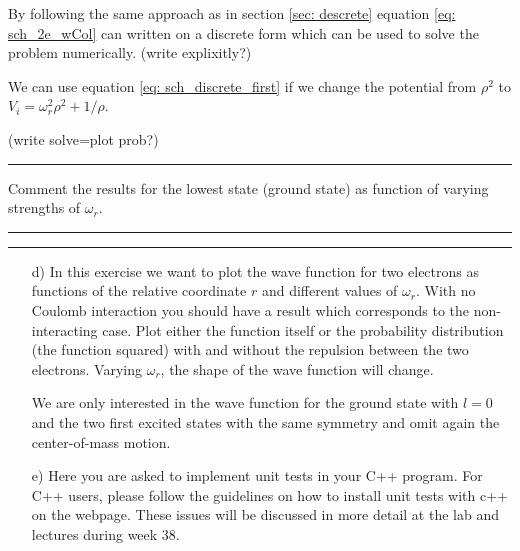 \documentclass[11pt,a4wide]{article}
\begin{document}
By following the same approach as in section \ref{sec: descrete} equation \ref{eq: sch_2e_wCol} can written on a discrete form which can be used to solve the problem numerically. (write explixitly?)

We can use equation \ref{eq: sch_discrete_first} if we change the potential from $\rho^2$ to $V_i = \omega_r^2\rho^2+1/\rho$. 

(write solve=plot prob?)









\noindent\rule{\textwidth}{1pt}
Comment the results for the lowest state (ground state) as function of
varying strengths of $\omega_r$. 
\noindent\rule{\textwidth}{1pt}


\noindent\rule{\textwidth}{1pt}
\begin{enumerate}

\item[d)] 
In this exercise we want to plot the wave function for two electrons as functions of the relative coordinate $r$ and different values of $\omega_r$.  With no Coulomb interaction you should have a result which corresponds to the non-interacting case. 
Plot either the function itself or the probability distribution (the function squared) with and without the repulsion between the two electrons.
Varying $\omega_r$, the shape of the wave function
will change.  

We are only interested in the wave function for the ground state with $l=0$ and the two first excited states with the same symmetry and
omit again the center-of-mass motion.

\item[e)]  
Here you are asked to implement unit tests in your C++ program. For C++ users, please follow the guidelines on how to install unit tests with c++ on the webpage. These issues will be discussed in more detail at the lab and lectures during week 38. 


\end{enumerate}
\end{document}
